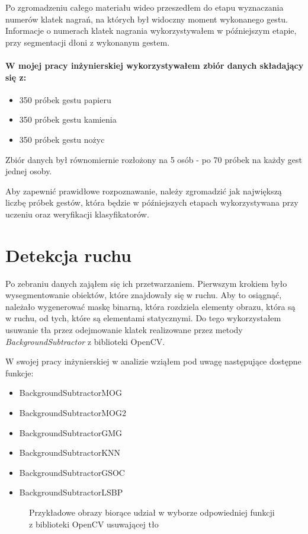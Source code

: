 \documentclass[a4paper,12pt,twoside,openany]{report}
\newcommand{\ImgPath}{.}
\begin{document}
Po zgromadzeniu całego materiału wideo przeszedłem do etapu wyznaczania numerów klatek nagrań, na których był widoczny moment wykonanego gestu. Informacje o numerach klatek nagrania wykorzystywałem w późniejszym etapie, przy segmentacji dłoni z wykonanym gestem.

\paragraph{W mojej pracy inżynierskiej wykorzystywałem zbiór danych składający się z:}
\begin{itemize}
	\item 350 próbek gestu papieru
	\item 350 próbek gestu kamienia
	\item 350 próbek gestu nożyc
\end{itemize}
 Zbiór danych był równomiernie rozłożony na 5 osób - po 70 próbek na każdy gest jednej osoby.
 
 Aby zapewnić prawidłowe rozpoznawanie, należy zgromadzić jak największą liczbę próbek gestów, która będzie w późniejszych etapach wykorzystywana przy uczeniu oraz weryfikacji klasyfikatorów.

\section{Detekcja ruchu}
Po zebraniu danych zająłem się ich przetwarzaniem. Pierwszym krokiem było wysegmentowanie obiektów, które znajdowały się w ruchu. Aby to osiągnąć, należało wygenerować maskę binarną, która rozdziela elementy obrazu, która są w ruchu, od tych, które są elementami statycznymi. Do tego wykorzystałem usuwanie tła przez odejmowanie klatek realizowane przez metody \textit{BackgroundSubtractor} z biblioteki OpenCV.

W swojej pracy inżynierskiej w analizie wziąłem pod uwagę następujące dostępne funkcje:

\begin{itemize} 
	\item BackgroundSubtractorMOG
	\item BackgroundSubtractorMOG2
	\item BackgroundSubtractorGMG
	\item BackgroundSubtractorKNN
	\item BackgroundSubtractorGSOC
	\item BackgroundSubtractorLSBP
\end{itemize} 

\begin{figure}[H]
	\centering
	\caption{Przykładowe obrazy biorące udział w wyborze odpowiedniej funkcji z biblioteki OpenCV usuwającej tło}
\end{figure}
\end{document}

